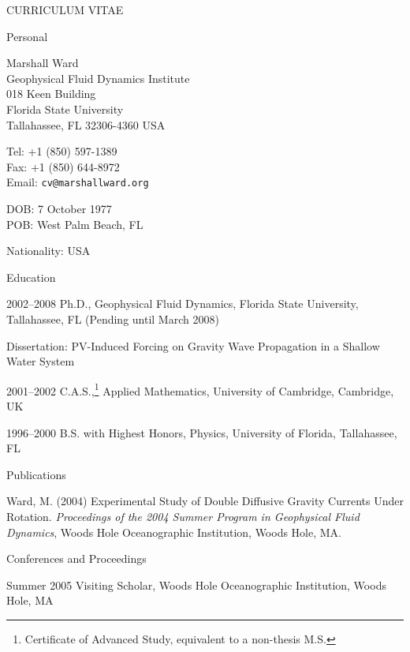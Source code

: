 \documentclass[11pt]{article}
\date{}
\begin{document}
\begin{cv}{CURRICULUM VITAE}

\begin{cvlist}{Personal}
  \item Marshall Ward \\
        Geophysical Fluid Dynamics Institute \\
        018 Keen Building \\
        Florida State University \\
        Tallahassee, FL 32306-4360 USA

  \item Tel: +1 (850) 597-1389 \\
        Fax: +1 (850) 644-8972 \\
        Email: \verb|cv@marshallward.org|

  \item DOB: 7 October 1977 \\
        POB: West Palm Beach, FL

  \item Nationality: USA
\end{cvlist}

\begin{cvlist}{Education}
  \item[2002--2008] Ph.D., Geophysical Fluid Dynamics, Florida State University, Tallahassee,
  FL (Pending until March 2008)

  Dissertation: PV-Induced Forcing on Gravity Wave Propagation in a Shallow Water System

  \item[2001--2002] C.A.S.,\footnote{Certificate of Advanced Study, equivalent to a non-thesis M.S.} Applied Mathematics, University of Cambridge, Cambridge, UK

  \item[1996--2000] B.S. with Highest Honors, Physics, University of Florida, Tallahassee, FL
\end{cvlist}

\begin{cvlist}{Publications}
  \item[ ] Ward, M. (2004) Experimental Study of Double Diffusive Gravity Currents Under Rotation. \emph{Proceedings of the 2004 Summer Program in Geophysical Fluid Dynamics}, Woods Hole Oceanographic Institution, Woods Hole, MA.
\end{cvlist}

\begin{cvlist}{Conferences and Proceedings}
  \item[Summer 2005] Visiting Scholar, Woods Hole Oceanographic Institution, Woods Hole, MA


\end{cvlist}
\end{cv}
\end{document}
